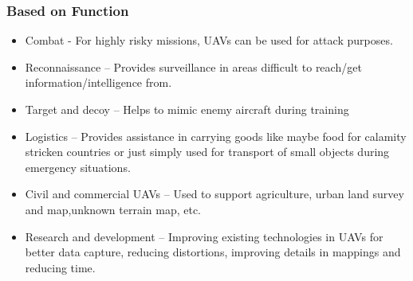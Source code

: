 \documentclass[11pt,twocolumn,letterpaper]{article}
\begin{document}
\subsubsection{Based on Function}
\begin{itemize}
\item Combat - For highly risky missions, UAVs can be used for attack purposes.
\item Reconnaissance – Provides surveillance in areas difficult to reach/get information/intelligence from. 
\item Target and decoy – Helps to mimic enemy aircraft during training
\item Logistics – Provides assistance in carrying goods like maybe food for calamity stricken countries or just simply used for transport of small objects during emergency situations.
\item Civil and commercial UAVs – Used to support agriculture, urban land survey and map,unknown terrain map, etc.
\item Research and development – Improving existing technologies in UAVs for better data capture, reducing distortions, improving details in mappings and reducing time.
\end{itemize}
\end{document}
